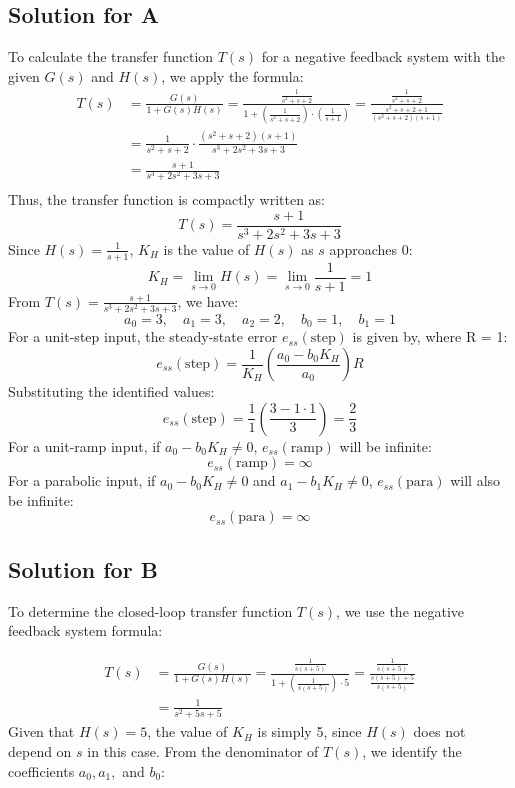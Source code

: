 \documentclass[11pt]{article}
\begin{document}
\newpage
\subsection*{Solution for A}
To calculate the transfer function \( T(s) \) for a negative feedback system with the given \( G(s) \) and \( H(s) \), we apply the formula:
\begin{align*}
T(s) &= \frac{G(s)}{1 + G(s)H(s)} = \frac{\frac{1}{s^2 + s + 2}}{1 + \left(\frac{1}{s^2 + s + 2}\right) \cdot \left(\frac{1}{s + 1}\right)} = \frac{\frac{1}{s^2 + s + 2}}{\frac{s^2 + s + 2 + 1}{(s^2 + s + 2)(s + 1)}} \\
&= \frac{1}{s^2 + s + 2} \cdot \frac{(s^2 + s + 2)(s + 1)}{s^3 + 2s^2 + 3s + 3} \\
&= \frac{s + 1}{s^3 + 2s^2 + 3s + 3} \\
\end{align*}
Thus, the transfer function is compactly written as:
\[
T(s) = \frac{s + 1}{s^3 + 2s^2 + 3s + 3}
\]
Since \( H(s) = \frac{1}{s + 1} \), \( K_H \) is the value of \( H(s) \) as \( s \) approaches 0:
\[
K_H = \lim_{{s \to 0}} H(s) = \lim_{{s \to 0}} \frac{1}{s + 1} = 1
\]
From \( T(s) = \frac{s + 1}{s^3 + 2s^2 + 3s + 3} \), we have:
\[
a_0 = 3, \quad a_1 = 3, \quad a_2 = 2, \quad b_0 = 1, \quad b_1 = 1
\]
For a unit-step input, the steady-state error \( e_{ss}(\text{step}) \) is given by, where R = 1:
\[
e_{ss}(\text{step}) = \frac{1}{K_H} \left( \frac{a_0 - b_0K_H}{a_0} \right)R
\]
Substituting the identified values:
\[
e_{ss}(\text{step}) = \frac{1}{1} \left( \frac{3 - 1 \cdot 1}{3} \right) = \frac{2}{3}
\]
For a unit-ramp input, if \( a_0 - b_0K_H \neq 0 \), \( e_{ss}(\text{ramp}) \) will be infinite:
\[
e_{ss}(\text{ramp}) = \infty
\]
For a parabolic input, if \( a_0 - b_0K_H \neq 0 \) and \( a_1 - b_1K_H \neq 0 \), \( e_{ss}(\text{para}) \) will also be infinite:
\[
e_{ss}(\text{para}) = \infty
\]




\newpage
\subsection*{Solution for B}
To determine the closed-loop transfer function \( T(s) \), we use the negative feedback system formula:

\begin{align*}
T(s) &= \frac{G(s)}{1 + G(s)H(s)} = \frac{\frac{1}{s(s + 5)}}{1 + \left(\frac{1}{s(s + 5)}\right) \cdot 5} = \frac{\frac{1}{s(s + 5)}}{\frac{s(s + 5) + 5}{s(s + 5)}} \\
&= \frac{1}{s^2 + 5s + 5}
\end{align*}
Given that \( H(s) = 5 \), the value of \( K_H \) is simply 5, since \( H(s) \) does not depend on \( s \) in this case.
From the denominator of \( T(s) \), we identify the coefficients \( a_0, a_1, \) and \( b_0 \):
\end{document}
